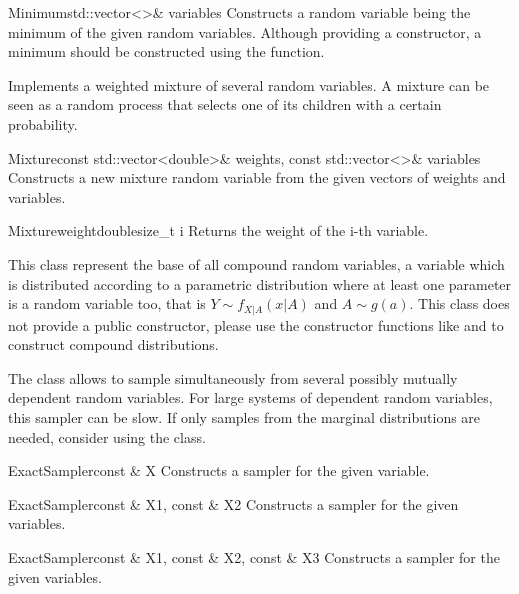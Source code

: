 \documentclass[a4paper, 10pt]{paper}
\begin{document}
\begin{classsyn}{Minimum}{std::vector<>\& variables}
Constructs a random variable being the minimum of the given random variables. Although providing a constructor, a minimum
should be constructed using the  function.
\end{classsyn}


Implements a weighted mixture of several random variables. A mixture can be seen as a random process that selects one of
its children with a certain probability.

\begin{classsyn}{Mixture}{const std::vector<double>\& weights, const std::vector<>\& variables}
Constructs a new mixture random variable from the given vectors of weights and variables. 
\end{classsyn}

\begin{defmeth}{Mixture}{weight}{double}{size\_t i}
Returns the weight of the i-th variable.
\end{defmeth}


This class represent the base of all compound random variables, a variable which is distributed according to a parametric distribution
where at least one parameter is a random variable too, that is $Y\sim f_{X|A}(x|A)$ and $A\sim g(a)$. This class does not provide 
a public constructor, please use the constructor functions like  and  to construct 
compound distributions.

The  class allows to sample simultaneously from several possibly mutually dependent random variables. For large 
systems of dependent random variables, this sampler can be slow. If only samples from the marginal distributions are needed, consider
using the  class.

\begin{classsyn}{ExactSampler}{const \& X}
Constructs a sampler for the given variable.
\end{classsyn}

\begin{classsyn}{ExactSampler}{const \& X1, const \& X2}
Constructs a sampler for the given variables.
\end{classsyn}

\begin{classsyn}{ExactSampler}{const \& X1, const \& X2, const \& X3}
Constructs a sampler for the given variables.
\end{classsyn}
\end{document}
